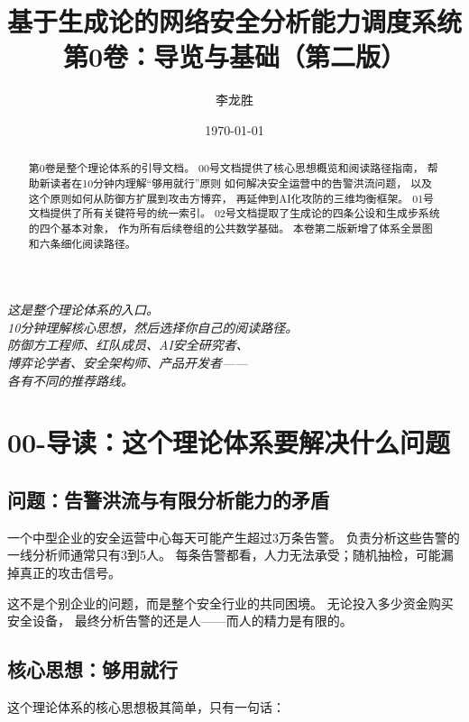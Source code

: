 \documentclass[11pt,a4paper]{article}
\title{基于生成论的网络安全分析能力调度系统\\
第0卷：导览与基础（第二版）}
\author{李龙胜}
\date{\today}
\begin{document}
\maketitle

\begin{center}
\textit{
这是整个理论体系的入口。\\
10分钟理解核心思想，然后选择你自己的阅读路径。\\
防御方工程师、红队成员、AI安全研究者、\\
博弈论学者、安全架构师、产品开发者——\\
各有不同的推荐路线。\\
}
\end{center}

\vspace{5mm}

\begin{abstract}
第0卷是整个理论体系的引导文档。
00号文档提供了核心思想概览和阅读路径指南，
帮助新读者在10分钟内理解“够用就行”原则
如何解决安全运营中的告警洪流问题，
以及这个原则如何从防御方扩展到攻击方博弈，
再延伸到AI化攻防的三维均衡框架。
01号文档提供了所有关键符号的统一索引。
02号文档提取了生成论的四条公设和生成步系统的四个基本对象，
作为所有后续卷组的公共数学基础。
本卷第二版新增了体系全景图和六条细化阅读路径。
\end{abstract}

\tableofcontents

\section{00-导读：这个理论体系要解决什么问题}

\subsection{问题：告警洪流与有限分析能力的矛盾}

一个中型企业的安全运营中心每天可能产生超过3万条告警。
负责分析这些告警的一线分析师通常只有3到5人。
每条告警都看，人力无法承受；随机抽检，可能漏掉真正的攻击信号。

这不是个别企业的问题，而是整个安全行业的共同困境。
无论投入多少资金购买安全设备，
最终分析告警的还是人——而人的精力是有限的。

\subsection{核心思想：够用就行}

这个理论体系的核心思想极其简单，只有一句话：
\end{document}
